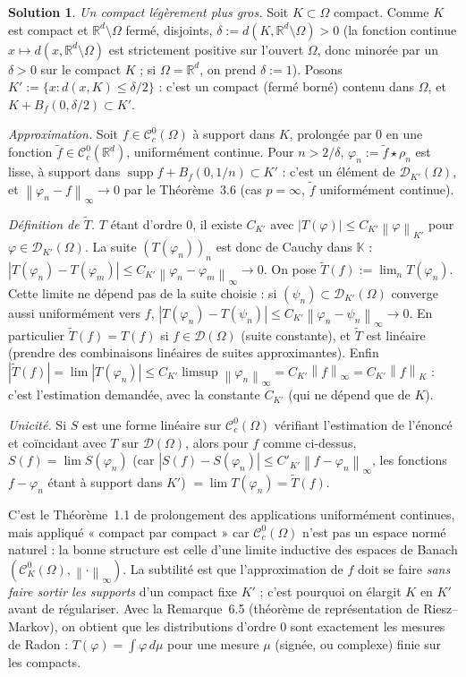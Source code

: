 \documentclass[11pt,a4paper]{article}
\newcommand{\R}{\mathbb{R}}
\newcommand{\K}{\mathbb{K}}
\newcommand{\Bf}{B_f}
\newcommand{\norm}[1]{\left\|#1\right\|}
\newcommand{\Cc}{\mathcal{C}^0_c}
\DeclareMathOperator{\supp}{supp}
\newcommand{\D}{\mathcal{D}}
\theoremstyle{definition}
\newtheorem*{solution}{Solution}
\begin{document}
\begin{solution}
\emph{Un compact légèrement plus gros.} Soit $K\subset\Omega$ compact. Comme $K$ est compact et $\R^d\setminus\Omega$ fermé, disjoints, $\delta:=d(K,\R^d\setminus\Omega)>0$ (la fonction continue $x\mapsto d(x,\R^d\setminus\Omega)$ est strictement positive sur l'ouvert $\Omega$, donc minorée par un $\delta>0$ sur le compact $K$ ; si $\Omega=\R^d$, on prend $\delta:=1$). Posons $K':=\{x:d(x,K)\le\delta/2\}$ : c'est un compact (fermé borné) contenu dans $\Omega$, et $K+\Bf(0,\delta/2)\subset K'$.

\emph{Approximation.} Soit $f\in\Cc(\Omega)$ à support dans $K$, prolongée par $0$ en une fonction $\tilde f\in\Cc(\R^d)$, uniformément continue. Pour $n>2/\delta$, $\varphi_n:=\tilde f\star\rho_n$ est lisse, à support dans $\supp f+\Bf(0,1/n)\subset K'$ : c'est un élément de $\D_{K'}(\Omega)$, et $\norm{\varphi_n-f}_\infty\to0$ par le Théorème~3.6 (cas $p=\infty$, $\tilde f$ uniformément continue).

\emph{Définition de $\tilde T$.} $T$ étant d'ordre $0$, il existe $C_{K'}$ avec $|T(\varphi)|\le C_{K'}\norm\varphi_{K'}$ pour $\varphi\in\D_{K'}(\Omega)$. La suite $(T(\varphi_n))_n$ est donc de Cauchy dans $\K$ : $|T(\varphi_n)-T(\varphi_m)|\le C_{K'}\norm{\varphi_n-\varphi_m}_\infty\to0$. On pose $\tilde T(f):=\lim_nT(\varphi_n)$. Cette limite ne dépend pas de la suite choisie : si $(\psi_n)\subset\D_{K'}(\Omega)$ converge aussi uniformément vers $f$, $|T(\varphi_n)-T(\psi_n)|\le C_{K'}\norm{\varphi_n-\psi_n}_\infty\to0$. En particulier $\tilde T(f)=T(f)$ si $f\in\D(\Omega)$ (suite constante), et $\tilde T$ est linéaire (prendre des combinaisons linéaires de suites approximantes). Enfin $|\tilde T(f)|=\lim|T(\varphi_n)|\le C_{K'}\limsup\norm{\varphi_n}_\infty=C_{K'}\norm f_\infty=C_{K'}\norm f_K$ : c'est l'estimation demandée, avec la constante $C_{K'}$ (qui ne dépend que de $K$).

\emph{Unicité.} Si $S$ est une forme linéaire sur $\Cc(\Omega)$ vérifiant l'estimation de l'énoncé et coïncidant avec $T$ sur $\D(\Omega)$, alors pour $f$ comme ci-dessus, $S(f)=\lim S(\varphi_n)$ (car $|S(f)-S(\varphi_n)|\le C'_{K'}\norm{f-\varphi_n}_\infty$, les fonctions $f-\varphi_n$ étant à support dans $K'$) $=\lim T(\varphi_n)=\tilde T(f)$.
\end{solution}

\begin{commentaire}
C'est le Théorème~1.1 de prolongement des applications uniformément continues, mais appliqué « compact par compact » car $\Cc(\Omega)$ n'est pas un espace normé naturel : la bonne structure est celle d'une limite inductive des espaces de Banach $(\mathcal C^0_{K}(\Omega),\norm\cdot_\infty)$. La subtilité est que l'approximation de $f$ doit se faire \emph{sans faire sortir les supports} d'un compact fixe $K'$ ; c'est pourquoi on élargit $K$ en $K'$ avant de régulariser. Avec la Remarque~6.5 (théorème de représentation de Riesz--Markov), on obtient que les distributions d'ordre $0$ sont exactement les mesures de Radon : $T(\varphi)=\int\varphi\,d\mu$ pour une mesure $\mu$ (signée, ou complexe) finie sur les compacts.
\end{commentaire}
\end{document}
